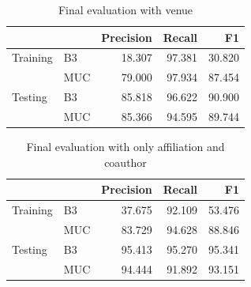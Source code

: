 \documentclass[twocolumn,letterpaper]{article}
\begin{document}
\begin{table}[ht]
\centering
\begin{tabular}{l || l | r r r}
 & & Precision & Recall & F1 \\ \hline
Training & B3 & 18.307 & 97.381 & 30.820 \\
 & MUC & 79.000 & 97.934 & 87.454\\ \hline
Testing & B3 & 85.818 & 96.622 & 90.900 \\
 & MUC & 85.366 & 94.595 & 89.744 \\
\end{tabular}
\caption{Final evaluation with venue}
\label{tab:all}
\end{table}

\begin{table}[ht]
\centering
\begin{tabular}{l || l | r r r}
 & & Precision & Recall & F1 \\ \hline
Training & B3 & 37.675 & 92.109 & 53.476 \\
 & MUC & 83.729 & 94.628 & 88.846\\ \hline
Testing & B3 & 95.413 & 95.270 & 95.341\\
 & MUC & 94.444 & 91.892 & 93.151 \\
\end{tabular}
\caption{Final evaluation with only affiliation and coauthor}
\label{tab:some}
\end{table}





\end{document}
